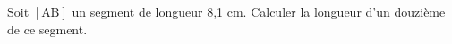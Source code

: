 \documentclass[exercice]{thedocument}%
\begin{document}
%
Soit $[\text{AB}]$ un segment de longueur 8,1 cm. \vskip5pt Calculer la longueur d'un
douzième de ce segment.
\end{document}
